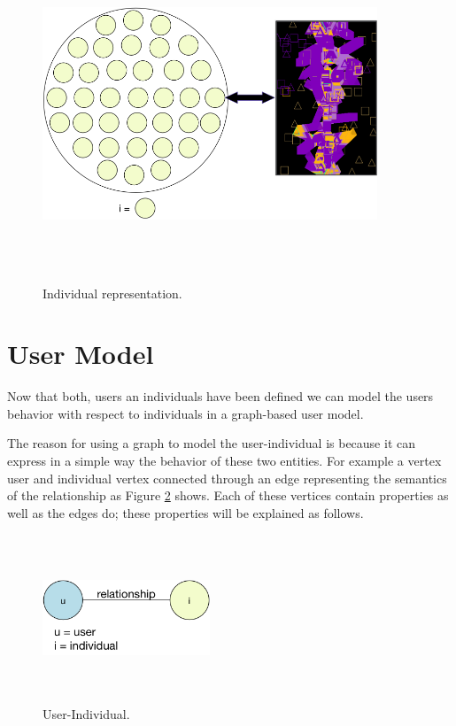 \begin{figure}
\captionsetup{justification=centering,margin=2cm}
\centering
\setlength\fboxsep{0pt}
\setlength\fboxrule{0.7pt}
\includegraphics[width=10cm,height=10cm,keepaspectratio]{img/individual.png}
\caption{Individual representation.}
\label{fig:individual}
\end{figure}


\section{User Model}
Now that both, users an individuals have been defined we can
model the users behavior with respect to individuals in a graph-based user
model.

The reason for using a graph to model the user-individual is because it
can express in a simple way the behavior of these two entities.
For example a vertex user and individual vertex connected through an edge
representing the semantics of the relationship
as Figure \ref{fig:User-Individual} shows. Each of these vertices contain
properties as well as the edges do; these properties will be explained as follows.

\begin{figure}
\captionsetup{justification=centering,margin=2cm}
\centering
\setlength\fboxsep{0pt}
\setlength\fboxrule{0.7pt}
\includegraphics[width=5cm,height=5cm,keepaspectratio]{img/user_individual.png}
\caption{User-Individual.}
\label{fig:User-Individual}
\end{figure}

